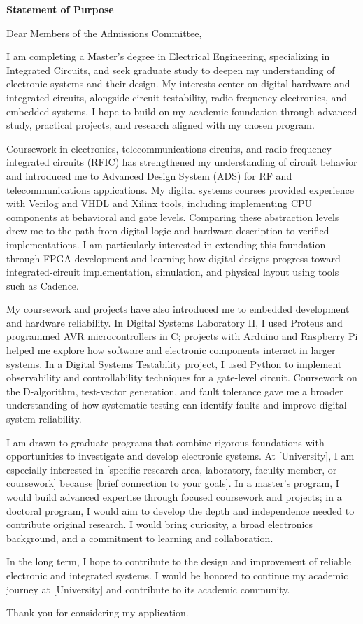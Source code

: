 \documentclass[11pt,a4paper]{article}
\begin{document}
\begin{center}
    \textbf{\large Statement of Purpose}
\end{center}
\vspace{-4pt}

Dear Members of the Admissions Committee,

I am completing a Master's degree in Electrical Engineering, specializing in Integrated Circuits, and seek graduate study to deepen my understanding of electronic systems and their design. My interests center on digital hardware and integrated circuits, alongside circuit testability, radio-frequency electronics, and embedded systems. I hope to build on my academic foundation through advanced study, practical projects, and research aligned with my chosen program.

Coursework in electronics, telecommunications circuits, and radio-frequency integrated circuits (RFIC) has strengthened my understanding of circuit behavior and introduced me to Advanced Design System (ADS) for RF and telecommunications applications. My digital systems courses provided experience with Verilog and VHDL and Xilinx tools, including implementing CPU components at behavioral and gate levels. Comparing these abstraction levels drew me to the path from digital logic and hardware description to verified implementations. I am particularly interested in extending this foundation through FPGA development and learning how digital designs progress toward integrated-circuit implementation, simulation, and physical layout using tools such as Cadence.

My coursework and projects have also introduced me to embedded development and hardware reliability. In Digital Systems Laboratory II, I used Proteus and programmed AVR microcontrollers in C; projects with Arduino and Raspberry Pi helped me explore how software and electronic components interact in larger systems. In a Digital Systems Testability project, I used Python to implement observability and controllability techniques for a gate-level circuit. Coursework on the D-algorithm, test-vector generation, and fault tolerance gave me a broader understanding of how systematic testing can identify faults and improve digital-system reliability.

I am drawn to graduate programs that combine rigorous foundations with opportunities to investigate and develop electronic systems. At [University], I am especially interested in [specific research area, laboratory, faculty member, or coursework] because [brief connection to your goals]. In a master's program, I would build advanced expertise through focused coursework and projects; in a doctoral program, I would aim to develop the depth and independence needed to contribute original research. I would bring curiosity, a broad electronics background, and a commitment to learning and collaboration.

In the long term, I hope to contribute to the design and improvement of reliable electronic and integrated systems. I would be honored to continue my academic journey at [University] and contribute to its academic community.

Thank you for considering my application.
\end{document}
